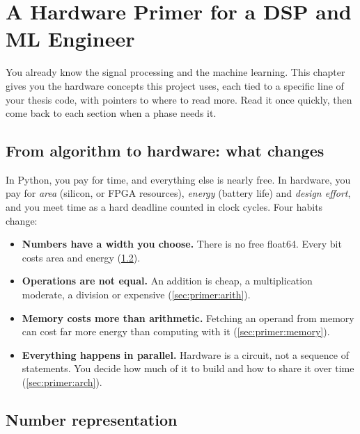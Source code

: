 \chapter{A Hardware Primer for a DSP and ML Engineer}\label{ch:primer}

You already know the signal processing and the machine learning. This chapter
gives you the hardware concepts this project uses, each tied to a specific line
of your thesis code, with pointers to where to read more. Read it once quickly,
then come back to each section when a phase needs it.

\section{From algorithm to hardware: what changes}\label{sec:primer:change}

In Python, you pay for time, and everything else is nearly free. In hardware,
you pay for \emph{area} (silicon, or FPGA resources), \emph{energy} (battery
life) and \emph{design effort}, and you meet time as a hard deadline counted in
clock cycles. Four habits change:
\begin{itemize}
  \item \textbf{Numbers have a width you choose.} There is no free float64.
        Every bit costs area and energy (\cref{sec:primer:numbers}).
  \item \textbf{Operations are not equal.} An addition is cheap, a
        multiplication moderate, a division or  expensive
        (\cref{sec:primer:arith}).
  \item \textbf{Memory costs more than arithmetic.} Fetching an operand from
        memory can cost far more energy than computing with it
        (\cref{sec:primer:memory}).
  \item \textbf{Everything happens in parallel.} Hardware is a circuit, not a
        sequence of statements. You decide how much of it to build and how to
        share it over time (\cref{sec:primer:arch}).
\end{itemize}

\section{Number representation}\label{sec:primer:numbers}

